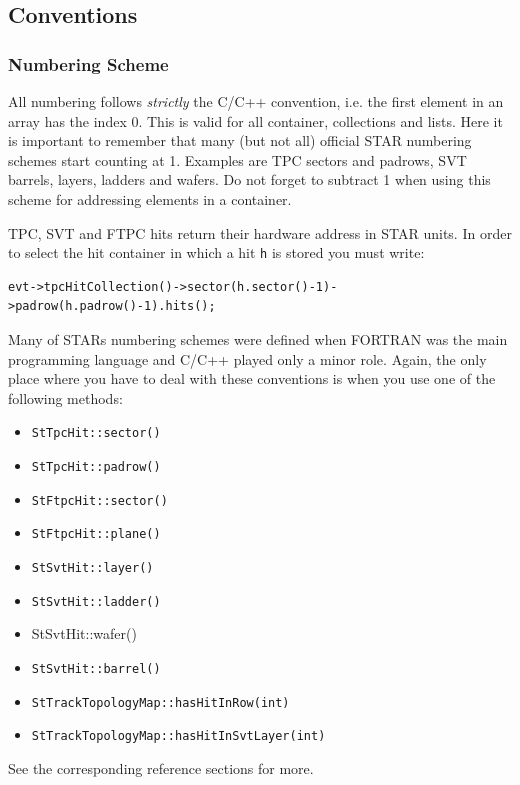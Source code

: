 \documentclass[twoside]{article}
\begin{document}
\subsection{Conventions}
\label{sec:conventions}

\subsubsection{Numbering Scheme}
\label{sec:conventionsNumbering}

All numbering follows \emph{strictly} the C/C++ convention, i.e. the
first element in an array has the index 0. This is valid for all
container, collections and lists. Here it is important to remember
that many (but not all) official STAR numbering schemes start counting
at 1.  Examples are TPC sectors and padrows, SVT barrels, layers, ladders and
wafers. Do not forget to subtract 1 when using this scheme for
addressing elements in a container.

TPC, SVT and FTPC hits return their hardware address in STAR units.
In order to select the hit container in which a hit \texttt{h} is
stored you must write:
\begin{verbatim}
evt->tpcHitCollection()->sector(h.sector()-1)->padrow(h.padrow()-1).hits();
\end{verbatim}

Many of STARs numbering schemes were defined when FORTRAN was the main
programming language and C/C++ played only a minor role. Again, the only
place where you have to deal with these conventions is when you use one of the
following methods:
\begin{itemize}
\item \texttt{StTpcHit::sector()}
\item \texttt{StTpcHit::padrow()}
\item \texttt{StFtpcHit::sector()}
\item \texttt{StFtpcHit::plane()}
\item \texttt{StSvtHit::layer()}
\item \texttt{StSvtHit::ladder()}
\item \textrm{StSvtHit::wafer(})
\item \texttt{StSvtHit::barrel()}
\item \texttt{StTrackTopologyMap::hasHitInRow(int)}
\item \texttt{StTrackTopologyMap::hasHitInSvtLayer(int)}
\end{itemize}
See the corresponding reference sections for more.
\end{document}
